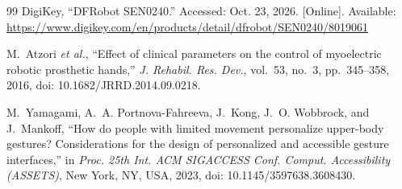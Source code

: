 \documentclass[conference]{IEEEtran}
\begin{document}
\begin{thebibliography}{99}
DigiKey, ``DFRobot SEN0240.'' Accessed: Oct. 23, 2026. [Online]. Available: \url{https://www.digikey.com/en/products/detail/dfrobot/SEN0240/8019061}

M.~Atzori \textit{et al.}, ``Effect of clinical parameters on the control of myoelectric robotic prosthetic hands,'' \textit{J. Rehabil. Res. Dev.}, vol.~53, no.~3, pp.~345--358, 2016, doi: 10.1682/JRRD.2014.09.0218.

M.~Yamagami, A.~A. Portnova-Fahreeva, J.~Kong, J.~O. Wobbrock, and J.~Mankoff, ``How do people with limited movement personalize upper-body gestures? Considerations for the design of personalized and accessible gesture interfaces,'' in \textit{Proc. 25th Int. ACM SIGACCESS Conf. Comput. Accessibility (ASSETS)}, New York, NY, USA, 2023, doi: 10.1145/3597638.3608430.

\end{thebibliography}
\end{document}
